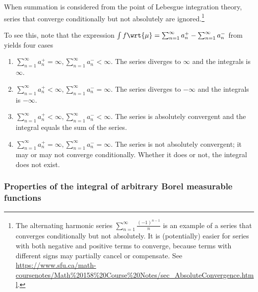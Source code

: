 \documentclass{article} %
\newcommand{\dmu}{\wrt{\mu}}
\begin{document}
\begin{remark}{}
When summation is considered from the point of Lebesgue integration theory, series that converge conditionally but not absolutely are ignored.\footnote{The alternating harmonic series $\sum_{n=1}^\infty \frac{(-1)^{n-1}}{n}$ is an example of a series that converges conditionally but not absolutely. It is (potentially) easier for series with both negative and positive terms to converge, because terms with different signs may partially cancel or compensate.  See \url{https://www.sfu.ca/math-coursenotes/Math\%20158\%20Course\%20Notes/sec\_AbsoluteConvergence.html}.} 

To see this, note that the expression $\int f \dmu = \sum_{n=1}^\infty a_n^+ - \sum_{n=1}^\infty a_n^-$ from  yields four cases

\begin{enumerate}
\item 	$\sum_{n=1}^\infty a_n^+ = \infty,  \sum_{n=1}^\infty a_n^- < \infty$.  The series diverges to $\infty$ and the integrals is $\infty$.
\item  $\sum_{n=1}^\infty a_n^+ < \infty,  \sum_{n=1}^\infty a_n^- = \infty$. The series diverges to $-\infty$ and the integrals is $-\infty$.
\item $\sum_{n=1}^\infty a_n^+ < \infty,  \sum_{n=1}^\infty a_n^- < \infty$. The series is absolutely convergent and the integral equals the sum of the series.
\item  $\sum_{n=1}^\infty a_n^+ = \infty,  \sum_{n=1}^\infty a_n^- = \infty$. The series is not absolutely convergent; it may or may not converge conditionally.  Whether it does or not, the integral does not exist.
\end{enumerate}
\end{remark}


\subsubsection{Properties of the integral of arbitrary Borel measurable functions} \label{sec:properties_of_integral_of_arbitrary_Borel_measurable_functions}
\end{document}
